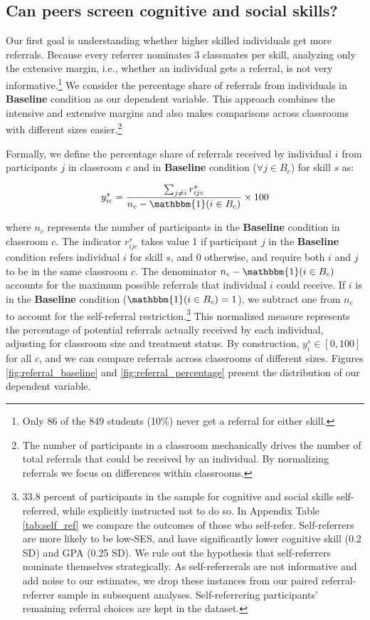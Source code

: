 \documentclass[11pt,a4paper,oneside]{article}
\begin{document}
\subsection{Can peers screen cognitive and social skills?}
Our first goal is understanding whether higher skilled individuals get more referrals. Because every referrer nominates 3 classmates per skill, analyzing only the extensive margin, i.e., whether an individual gets a referral, is not very informative.\footnote{Only 86 of the 849 students (10\%) never get a referral for either skill.} We consider the percentage share of referrals from individuals in \textbf{Baseline} condition as our dependent variable. This approach combines the intensive and extensive margins and also makes comparisons across classrooms with different sizes easier.\footnote{The number of participants in a classroom mechanically drives the number of total referrals that could be received by an individual. By normalizing referrals we focus on differences within classrooms.} 

Formally, we define the percentage share of  referrals received by individual $i$ from participants $j$ in classroom $c$ and in \textbf{Baseline} condition ($\forall j \in B_c$) for skill $s$ as: 

\begin{equation}\label{ys_def}
    y_{ic}^s = \frac{\sum_{j \neq i} r_{ijc}^s}{n_{c} - \mathbbm{1}(i \in B_c)} \times 100
    \end{equation}
  
where $n_c$ represents the number of participants in the \textbf{Baseline} condition in classroom $c$. The indicator $r_{ijc}^s$ takes value 1 if participant $j$ in the \textbf{Baseline} condition refers individual $i$ for skill $s$, and 0 otherwise, and require both $i$ and $j$ to be in the same classroom $c$. The denominator $n_{c} - \mathbbm{1}(i \in B_c)$ accounts for the maximum possible referrals that individual $i$ could receive. If $i$ is in the \textbf{Baseline} condition ($\mathbbm{1}(i \in B_c)=1$), we subtract one from $n_c$ to account for the self-referral restriction.\footnote{33.8 percent of participants in the sample for cognitive and social skills self-referred, while explicitly instructed not to do so. In Appendix Table \ref{tab:self_ref} we compare the outcomes of those who self-refer. Self-referrers are more likely to be low-SES, and have significantly lower cognitive skill (0.2 SD) and GPA (0.25 SD). We rule out the hypothesis that self-referrers nominate themselves strategically. As self-referrerals are not informative and add noise to our estimates, we drop these instances from our paired referral-referrer sample in subsequent analyses. Self-referrering participants' remaining referral choices are kept in the dataset.}
This normalized measure represents the percentage of potential referrals actually received by each individual, adjusting for classroom size and treatment status. By construction, $y_{i}^s \in [0,100]$ for all $c$, and we can compare referrals across classrooms of different sizes. Figures \ref{fig:referral_baseline} and \ref{fig:referral_percentage} present the distribution of our dependent variable. 
\end{document}
